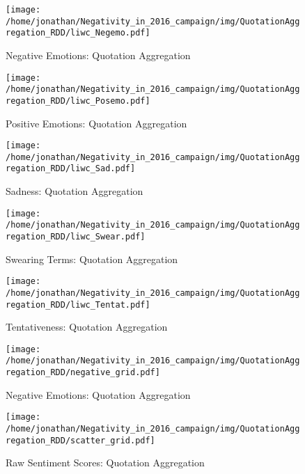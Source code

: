\begin{figure}[h]\centering
	\texttt{[image: /home/jonathan/Negativity\_in\_2016\_campaign/img/QuotationAggregation\_RDD/liwc\_Negemo.pdf]}
	\caption{Negative Emotions: Quotation Aggregation}
	\label{fig: qa_Negative Emotions}
\end{figure}

\begin{figure}[h]\centering
	\texttt{[image: /home/jonathan/Negativity\_in\_2016\_campaign/img/QuotationAggregation\_RDD/liwc\_Posemo.pdf]}
	\caption{Positive Emotions: Quotation Aggregation}
	\label{fig: qa_Positive Emotions}
\end{figure}

\begin{figure}[h]\centering
	\texttt{[image: /home/jonathan/Negativity\_in\_2016\_campaign/img/QuotationAggregation\_RDD/liwc\_Sad.pdf]}
	\caption{Sadness: Quotation Aggregation}
	\label{fig: qa_Sadness}
\end{figure}

\begin{figure}[h]\centering
	\texttt{[image: /home/jonathan/Negativity\_in\_2016\_campaign/img/QuotationAggregation\_RDD/liwc\_Swear.pdf]}
	\caption{Swearing Terms: Quotation Aggregation}
	\label{fig: qa_Swearing Terms}
\end{figure}

\begin{figure}[h]\centering
	\texttt{[image: /home/jonathan/Negativity\_in\_2016\_campaign/img/QuotationAggregation\_RDD/liwc\_Tentat.pdf]}
	\caption{Tentativeness: Quotation Aggregation}
	\label{fig: qa_Tentativeness}
\end{figure}

\begin{figure}[h]\centering
	\texttt{[image: /home/jonathan/Negativity\_in\_2016\_campaign/img/QuotationAggregation\_RDD/negative\_grid.pdf]}
	\caption{Negative Emotions: Quotation Aggregation}
	\label{fig: qa_Negative Emotions}
\end{figure}

\begin{figure}[h]\centering
	\texttt{[image: /home/jonathan/Negativity\_in\_2016\_campaign/img/QuotationAggregation\_RDD/scatter\_grid.pdf]}
	\caption{Raw Sentiment Scores: Quotation Aggregation}
	\label{fig: qa_Raw Sentiment Scores}
\end{figure}

\clearpage
\pagebreak

